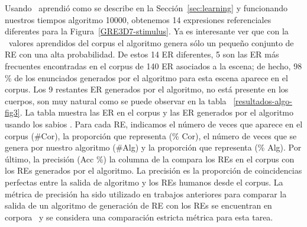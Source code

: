 

Usando \puse \ aprendi\'o como se describe en la Secci\'on~\ref{sec:learning} y funcionando
nuestros tiempos algoritmo 10000, obtenemos 14 expresiones referenciales diferentes
para la Figura~\ref{GRE3D7-stimulus}. Ya es interesante ver que con la
\ \puse valores aprendidos del corpus el algoritmo genera s\'olo un peque\~no conjunto de RE con una alta probabilidad.
De estos 14 ER diferentes, 5 son las ER m\'as frecuentes encontradas en el corpus de 140 ER asociados a la escena; de hecho, 98 \% de los enunciados generados por el algoritmo para esta escena aparece en el corpus.
Los 9 restantes ER generados por el algoritmo, no est\'a presente en los cuerpos, son muy natural como se puede observar en la tabla
~\ref{resultados-algo-fig3}.
La tabla muestra las ER en el corpus y las ER generados por el algoritmo usando los sabios \puse. Para cada RE, indicamos el n\'umero de veces que aparece en el corpus (\#Cor), la proporci\'on que representa (\% Cor), el n\'umero de veces que se genera por nuestro algoritmo (\#Alg) y la proporci\'on que representa (\% Alg). Por \'ultimo, la precisi\'on (Acc \%) la columna de la compara los REs en el corpus con los REs generados por el algoritmo. La precisi\'on es la proporci\'on de coincidencias perfectas entre la salida de algoritmo y los REs humanos desde el corpus. La m\'etrica de precisi\'on ha sido utilizado en trabajos anteriores para comparar la salida de un algoritmo de generaci\'on de RE con los REs se encuentran en corpora~\cite{sluis07:eval,viet:gene11} y se considera una comparaci\'on estricta m\'etrica para esta tarea.



